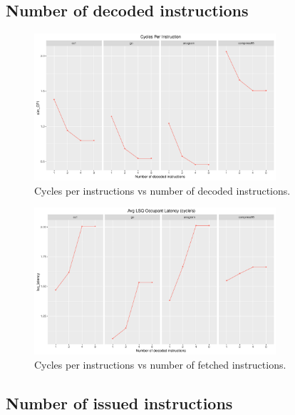 \documentclass[10pt]{scrartcl}
\begin{document}
\subsection{Number of decoded instructions}

\begin{figure}[h]
  \centering
  \includegraphics[width=0.8\textwidth]{Plots/plot_D_sim_CPI}
  \caption{Cycles per instructions vs number of decoded instructions.}\label{fig:d_sim_cpi}
\end{figure}

\begin{figure}[h]
  \centering
  \includegraphics[width=0.8\textwidth]{Plots/plot_D_lsq_latency}
  \caption{Cycles per instructions vs number of fetched instructions.}\label{fig:d_lsq_latency}
\end{figure}

\FloatBarrier

\subsection{Number of issued instructions}
\end{document}
